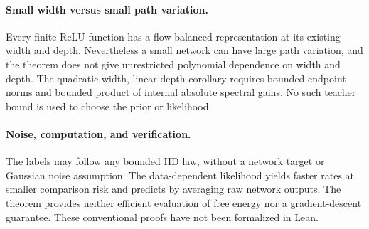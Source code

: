 \paragraph{Small width versus small path variation.}
Every finite ReLU function has a flow-balanced representation at its existing width and depth. Nevertheless a small network can have large path variation, and the theorem does not give unrestricted polynomial dependence on width and depth. The quadratic-width, linear-depth corollary requires bounded endpoint norms and bounded product of internal absolute spectral gains. No such teacher bound is used to choose the prior or likelihood.

\paragraph{Noise, computation, and verification.}
The labels may follow any bounded IID law, without a network target or Gaussian noise assumption. The data-dependent likelihood yields faster rates at smaller comparison risk and predicts by averaging raw network outputs. The theorem provides neither efficient evaluation of free energy nor a gradient-descent guarantee. These conventional proofs have not been formalized in Lean.

